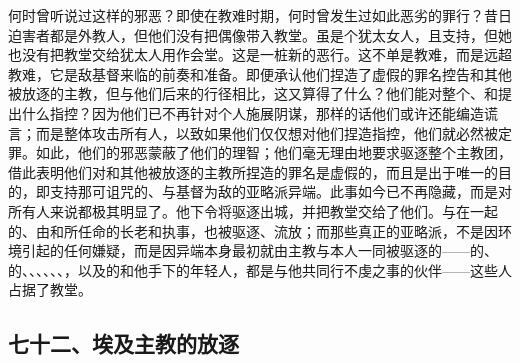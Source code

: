 何时曾听说过这样的邪恶？即使在教难时期，何时曾发生过如此恶劣的罪行？昔日迫害者都是外教人，但他们没有把偶像带入教堂。虽是个犹太女人，且支持，但她也没有把教堂交给犹太人用作会堂。这是一桩新的恶行。这不单是教难，而是远超教难，它是敌基督来临的前奏和准备。即便承认他们捏造了虚假的罪名控告和其他被放逐的主教，但与他们后来的行径相比，这又算得了什么？他们能对整个、和提出什么指控？因为他们已不再针对个人施展阴谋，那样的话他们或许还能编造谎言；而是整体攻击所有人，以致如果他们仅仅想对他们捏造指控，他们就必然被定罪。如此，他们的邪恶蒙蔽了他们的理智；他们毫无理由地要求驱逐整个主教团，借此表明他们对和其他被放逐的主教所捏造的罪名是虚假的，而且是出于唯一的目的，即支持那可诅咒的、与基督为敌的亚略派异端。此事如今已不再隐藏，而是对所有人来说都极其明显了。他下令将驱逐出城，并把教堂交给了他们。与在一起的、由和所任命的长老和执事，也被驱逐、流放；而那些真正的亚略派，不是因环境引起的任何嫌疑，而是因异端本身最初就由主教与本人一同被驱逐的——的、的、、、、、、，以及的和他手下的年轻人，都是与他共同行不虔之事的伙伴——这些人占据了教堂。\par


\subsection{七十二、埃及主教的放逐}

